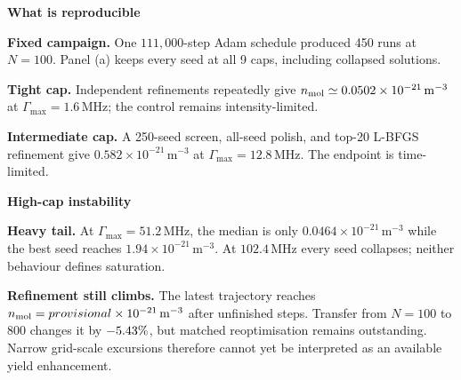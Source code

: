 \documentclass[9pt,a4paper,twocolumn,twoside]{rho-class/rho}
\newcommand{\ShowcaseSweepRuns}{450}%
\newcommand{\ShowcaseSweepCaps}{9}%
\newcommand{\ShowcaseFortyDensityScaled}{0.0502}%
\newcommand{\ShowcaseThreeTwentyDensityScaled}{0.582}%
\newcommand{\ShowcaseTwelveEightyDensityScaled}{provisional}%
\newcommand{\ShowcaseFortyCapMHz}{1.6}%
\newcommand{\ShowcaseThreeTwentyCapMHz}{12.8}%
\newcommand{\ShowcaseTwelveEightyCapMHz}{51.2}%
\newcommand{\ShowcaseHighCapSteps}{unfinished}%
\newcommand{\ShowcaseBaselineTwelveEightyMedianDensityScaled}{0.0464}%
\newcommand{\ShowcaseBaselineTwelveEightyBestDensityScaled}{1.94}%
\newcommand{\showcasecardheading}[1]{%
    {\color{showcasenavy}\sffamily\bfseries\fontsize{12}{14}\selectfont #1\par}%
    \vspace{1mm}%
}
\begin{document}
\vspace{2mm}
\begin{minipage}[t]{0.315\textwidth}
    \vspace{0pt}
    \begin{tcolorbox}[showcasecard,colframe=showcaseblue,colback=showcaseblue!4,top=1.8mm,bottom=1.8mm]
        \showcasecardheading{What is reproducible}
        {\sffamily\fontsize{7.7}{9.4}\selectfont
        \textbf{Fixed campaign.} One $111{,}000$-step Adam schedule produced \ShowcaseSweepRuns{} runs at $N=100$. Panel (a) keeps every seed at all \ShowcaseSweepCaps{} caps, including collapsed solutions.

        \vspace{0.8mm}
        \textbf{Tight cap.} Independent refinements repeatedly give $n_{\rm mol}\simeq\ShowcaseFortyDensityScaled\times10^{-21}\,\mathrm{m}^{-3}$ at $\Gamma_{\max}=\ShowcaseFortyCapMHz\,\mathrm{MHz}$; the control remains intensity-limited.

        \vspace{0.8mm}
        \textbf{Intermediate cap.} A 250-seed screen, all-seed polish, and top-20 L-BFGS refinement give $\ShowcaseThreeTwentyDensityScaled\times10^{-21}\,\mathrm{m}^{-3}$ at $\Gamma_{\max}=\ShowcaseThreeTwentyCapMHz\,\mathrm{MHz}$. The endpoint is time-limited.}
    \end{tcolorbox}
\end{minipage}\hfill
\begin{minipage}[t]{0.315\textwidth}
    \vspace{0pt}
    \begin{tcolorbox}[showcasecard,colframe=showcasered,colback=showcasered!4,top=1.8mm,bottom=1.8mm]
        \showcasecardheading{High-cap instability}
        {\sffamily\fontsize{7.7}{9.4}\selectfont
        \textbf{Heavy tail.} At $\Gamma_{\max}=\ShowcaseTwelveEightyCapMHz\,\mathrm{MHz}$, the median is only $\ShowcaseBaselineTwelveEightyMedianDensityScaled\times10^{-21}\,\mathrm{m}^{-3}$ while the best seed reaches $\ShowcaseBaselineTwelveEightyBestDensityScaled\times10^{-21}\,\mathrm{m}^{-3}$. At $102.4\,\mathrm{MHz}$ every seed collapses; neither behaviour defines saturation.

        \vspace{0.8mm}
        \textbf{Refinement still climbs.} The latest trajectory reaches $n_{\rm mol}=\ShowcaseTwelveEightyDensityScaled\times10^{-21}\,\mathrm{m}^{-3}$ after \ShowcaseHighCapSteps{} steps. Transfer from $N=100$ to 800 changes it by $-5.43\%$, but matched reoptimisation remains outstanding. Narrow grid-scale excursions therefore cannot yet be interpreted as an available yield enhancement.}
    \end{tcolorbox}
\end{minipage}\hfill
\end{document}

